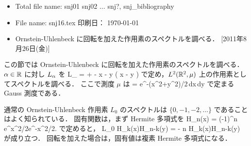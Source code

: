 %
\hide
\vspace{-4mm}
\begin{itemize} \itemsep=-2mm \parsep=0mm
\item Total file name: snj01 snj02 $\dots $ snj?, snj\_bibliography
\item File name: snj16.tex \hfill 印刷日： \today \ \now
\item Ornstein-Uhlenbeck に回転を加えた作用素のスペクトルを調べる．
[2011年8月26日(金)]
\end{itemize}
\endhide
{} %
この節では Ornstein-Uhlenbeck に回転を加えた作用素のスペクトルを調べる．
$\alpha\in{\mathbb R}$ に対し $L_{\alpha}$ を
\bdn %
L_\al
=  +  
  - x  - y 
  \alpha \biggl( x  - y  \biggr)
\edn %
で定め，$L^2({\mathbb R}^2, \mu)$ 上の作用素としてスペクトルを調べる．
ここで測度 $\mu$ は
\bdn %
\mu
=  e^{-(x^2+y^2)/2}\,dx\,dy
\edn %
で定まるGauss 測度である．

通常の Ornstein-Uhlenbeck 作用素 $L_0$ のスペクトルは $\{0,-1,-2,\dots\}$
であることはよく知られている．
固有関数は，まず Hermite 多項式を
\bdn %
H_n(x)
= (-1)^n e^{x^2/2}e^{-x^2/2}.
\edn %
で定めると，
\bdm %
L_0 H_k(x)H_{n-k}(y)
= - n H_k(x)H_{n-k}(y)
\edm %
が成り立つ．
回転を加えた場合は，固有値は複素 Hermite 多項式になる．

